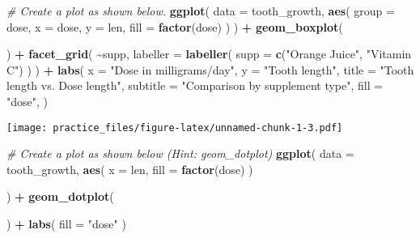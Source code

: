 \documentclass[
]{article}
\newenvironment{Shaded}{\begin{snugshade}}{\end{snugshade}}
\newcommand{\AttributeTok}[1]{\textcolor[rgb]{0.13,0.29,0.53}{#1}}
\newcommand{\CommentTok}[1]{\textcolor[rgb]{0.56,0.35,0.01}{\textit{#1}}}
\newcommand{\FunctionTok}[1]{\textcolor[rgb]{0.13,0.29,0.53}{\textbf{#1}}}
\newcommand{\NormalTok}[1]{#1}
\newcommand{\SpecialCharTok}[1]{\textcolor[rgb]{0.81,0.36,0.00}{\textbf{#1}}}
\newcommand{\StringTok}[1]{\textcolor[rgb]{0.31,0.60,0.02}{#1}}
\begin{document}
\begin{Shaded}
\begin{Highlighting}[]
\CommentTok{\# Create a plot as shown below.}
\FunctionTok{ggplot}\NormalTok{(}
  \AttributeTok{data =}\NormalTok{ tooth\_growth,}
  \FunctionTok{aes}\NormalTok{(    }\AttributeTok{group =} \StringTok{\textasciigrave{}}\AttributeTok{dose}\StringTok{\textasciigrave{}}\NormalTok{,    }\AttributeTok{x =} \StringTok{\textasciigrave{}}\AttributeTok{dose}\StringTok{\textasciigrave{}}\NormalTok{,    }\AttributeTok{y =} \StringTok{\textasciigrave{}}\AttributeTok{len}\StringTok{\textasciigrave{}}\NormalTok{,    }\AttributeTok{fill =} \FunctionTok{factor}\NormalTok{(}\StringTok{\textasciigrave{}}\AttributeTok{dose}\StringTok{\textasciigrave{}}\NormalTok{)  )}
\NormalTok{) }\SpecialCharTok{+} \FunctionTok{geom\_boxplot}\NormalTok{(}
  
\NormalTok{) }\SpecialCharTok{+} \FunctionTok{facet\_grid}\NormalTok{(}
  \SpecialCharTok{\textasciitilde{}}\StringTok{\textasciigrave{}}\AttributeTok{supp}\StringTok{\textasciigrave{}}\NormalTok{,}
  \AttributeTok{labeller =} \FunctionTok{labeller}\NormalTok{(}
    \AttributeTok{supp =} \FunctionTok{c}\NormalTok{(}\StringTok{"Orange Juice"}\NormalTok{, }\StringTok{"Vitamin C"}\NormalTok{)}
\NormalTok{  )}
\NormalTok{) }\SpecialCharTok{+} \FunctionTok{labs}\NormalTok{(}
  \AttributeTok{x =} \StringTok{"Dose in milligrams/day"}\NormalTok{,}
  \AttributeTok{y =} \StringTok{"Tooth length"}\NormalTok{,}
  \AttributeTok{title =} \StringTok{"Tooth length vs. Dose length"}\NormalTok{,}
  \AttributeTok{subtitle =} \StringTok{"Comparison by supplement type"}\NormalTok{,}
  \AttributeTok{fill =} \StringTok{"dose"}\NormalTok{,}
\NormalTok{)}
\end{Highlighting}
\end{Shaded}

\texttt{[image: practice\_files/figure-latex/unnamed-chunk-1-3.pdf]}

\begin{Shaded}
\begin{Highlighting}[]
\CommentTok{\# Create a plot as shown below (Hint: geom\_dotplot)}
\FunctionTok{ggplot}\NormalTok{(}
  \AttributeTok{data =}\NormalTok{ tooth\_growth,}
  \FunctionTok{aes}\NormalTok{(}
    \AttributeTok{x =} \StringTok{\textasciigrave{}}\AttributeTok{len}\StringTok{\textasciigrave{}}\NormalTok{,}
    \AttributeTok{fill =} \FunctionTok{factor}\NormalTok{(}\StringTok{\textasciigrave{}}\AttributeTok{dose}\StringTok{\textasciigrave{}}\NormalTok{)}
\NormalTok{  )}
  
\NormalTok{) }\SpecialCharTok{+} \FunctionTok{geom\_dotplot}\NormalTok{(}
  
\NormalTok{) }\SpecialCharTok{+} \FunctionTok{labs}\NormalTok{(}
  \AttributeTok{fill =} \StringTok{"dose"}
\NormalTok{)}
\end{Highlighting}
\end{Shaded}
\end{document}

